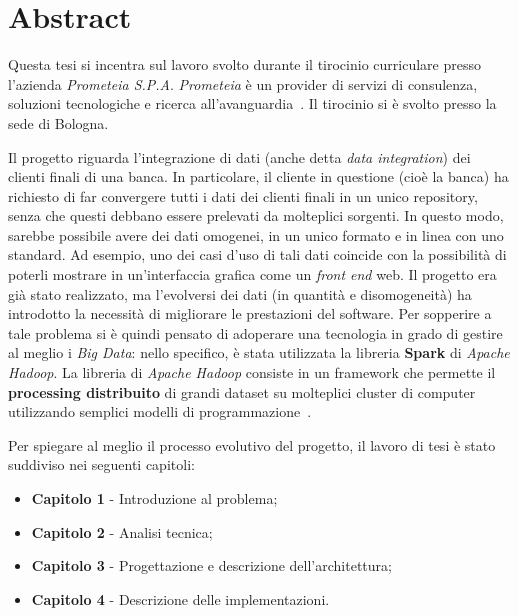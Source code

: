 \chapter*{Abstract}

Questa tesi si incentra sul lavoro svolto durante il tirocinio curriculare presso l'azienda \textit{Prometeia S.P.A}.
\textit{Prometeia} è un provider di servizi di consulenza, soluzioni tecnologiche e ricerca all'avanguardia~\cite{Prometeia-aboutus}.
Il tirocinio si è svolto presso la sede di Bologna.

Il progetto riguarda l'integrazione di dati (anche detta \textit{data integration}) dei clienti finali di una banca.
In particolare, il cliente in questione (cioè la banca) ha richiesto di far convergere tutti i dati dei clienti finali in un unico repository, senza che questi debbano essere prelevati da molteplici sorgenti.
In questo modo, sarebbe possibile avere dei dati omogenei, in un unico formato e in linea con uno standard.
Ad esempio, uno dei casi d'uso di tali dati coincide con la possibilità di poterli mostrare in un'interfaccia grafica come un \textit{front end} web.
Il progetto era già stato realizzato, ma l'evolversi dei dati (in quantità e disomogeneità) ha introdotto la necessità di migliorare le prestazioni del software.
Per sopperire a tale problema si è quindi pensato di adoperare una tecnologia in grado di gestire al meglio i \textit{Big Data}: nello specifico, è stata utilizzata la libreria \textbf{Spark} di \textit{Apache Hadoop}.
La libreria di \textit{Apache Hadoop} consiste in un framework che permette il \textbf{processing distribuito} di grandi dataset su molteplici cluster di computer utilizzando semplici modelli di programmazione~\cite{Apache-hadoop}.

Per spiegare al meglio il processo evolutivo del progetto, il lavoro di tesi è stato suddiviso nei seguenti capitoli:

\begin{itemize}
    \item \textbf{Capitolo 1} - Introduzione al problema;
    \item \textbf{Capitolo 2} - Analisi tecnica;
    \item \textbf{Capitolo 3} - Progettazione e descrizione dell'architettura;
    \item \textbf{Capitolo 4} - Descrizione delle implementazioni.
\end{itemize}

\clearpage
